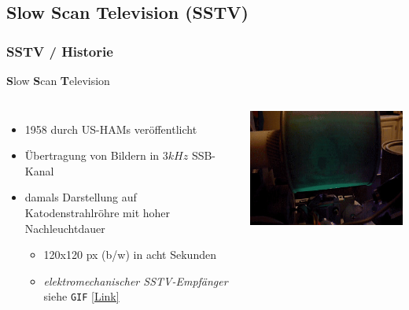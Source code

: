\subsection[SSTV]{Slow Scan Television (SSTV)}

\begin{frame}
    \frametitle{SSTV / Historie}

    \textbf{S}low \textbf{S}can \textbf{T}elevision\\[1.5em]

    \begin{columns}[c]
        \column[c]{7cm}
        \begin{itemize}
            \item 1958 durch US-HAMs veröffentlicht
            \item Übertragung von Bildern in $3 kHz$ SSB-Kanal
            \item damals Darstellung auf Katodenstrahlröhre mit hoher Nachleuchtdauer
            \begin{itemize}
                \item 120x120 px (b/w) in acht Sekunden
                \item \emph{elektromechanischer SSTV-Empfänger} siehe \texttt{GIF}
                      \href{https://upload.wikimedia.org/wikipedia/commons/1/1e/Mechanical_glow_drum_slow_scan_television_monitor.gif}{[Link]}
            \end{itemize}
        \end{itemize}
        \column{6cm}
        \begin{center}
            \includegraphics[width=.9\textwidth]{e16/Mechanical_glow_drum_slow_scan_television_monitor.jpg}
            \tiny \hyperlink{refs}{\cite{wc}}
        \end{center}
    \end{columns}

\end{frame}

